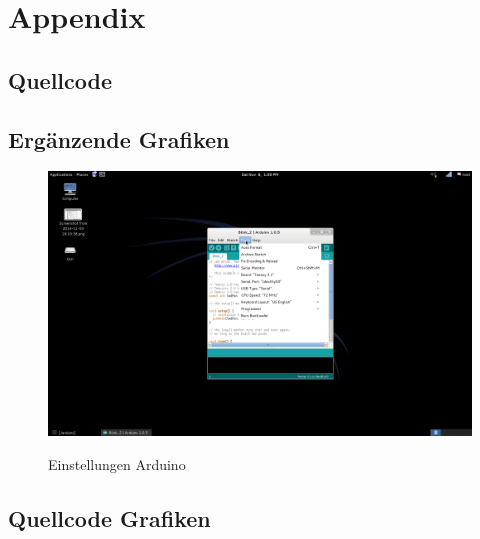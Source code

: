 
\appendix
\chapter{Appendix}
\section{Quellcode}


\lstset{language=C}


\newpage
\section{Ergänzende Grafiken}

\begin{figure}[htbp]

\centering
\includegraphics[width=\textwidth]{bilder/EinstellungenArduino2.png}
\label{fig:EinstellungenArduino}
\caption{Einstellungen Arduino}
\end{figure}


\section{Quellcode Grafiken}
\lstset{language=tikz}



